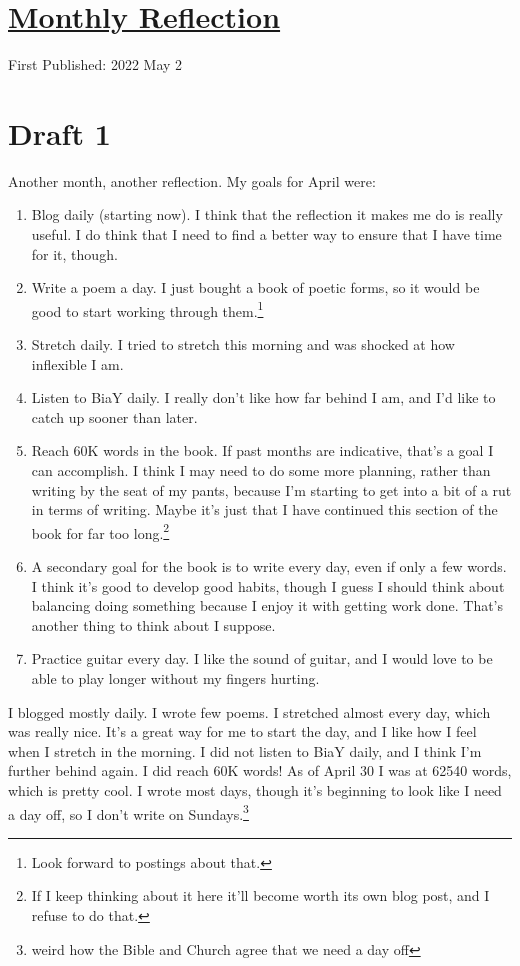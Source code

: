 \documentclass[12pt]{article}[titlepage]
\renewcommand{\,}{\textsuperscript{,}}
\begin{document}
\doublespacing
\section{\href{reflection-april-22.html}{Monthly Reflection}}
First Published: 2022 May 2

\section{Draft 1}
Another month, another reflection.
My goals for April were:
\begin{enumerate}
\item Blog daily (starting now). I think that the reflection it makes me do is really useful. I do think that I need to find a better way to ensure that I have time for it, though.
\item Write a poem a day. I just bought a book of poetic forms, so it would be good to start working through them.\footnote{Look forward to postings about that.}
\item Stretch daily. I tried to stretch this morning and was shocked at how inflexible I am.
\item Listen to BiaY daily. I really don't like how far behind I am, and I'd like to catch up sooner than later.
\item Reach 60K words in the book. If past months are indicative, that's a goal I can accomplish. I think I may need to do some more planning, rather than writing by the seat of my pants, because I'm starting to get into a bit of a rut in terms of writing. Maybe it's just that I have continued this section of the book for far too long.\footnote{If I keep thinking about it here it'll become worth its own blog post, and I refuse to do that.}
\item A secondary goal for the book is to write every day, even if only a few words. I think it's good to develop good habits, though I guess I should think about balancing doing something because I enjoy it with getting work done. That's another thing to think about I suppose.
\item Practice guitar every day. I like the sound of guitar, and I would love to be able to play longer without my fingers hurting.
\end{enumerate}

I blogged mostly daily.
I wrote few poems.
I stretched almost every day, which was really nice.
It's a great way for me to start the day, and I like how I feel when I stretch in the morning.
I did not listen to BiaY daily, and I think I'm further behind again.
I did reach 60K words! As of April 30 I was at 62540 words, which is pretty cool.
I wrote most days, though it's beginning to look like I need a day off, so I don't write on Sundays.\footnote{weird how the Bible and Church agree that we need a day off}
\end{document}
